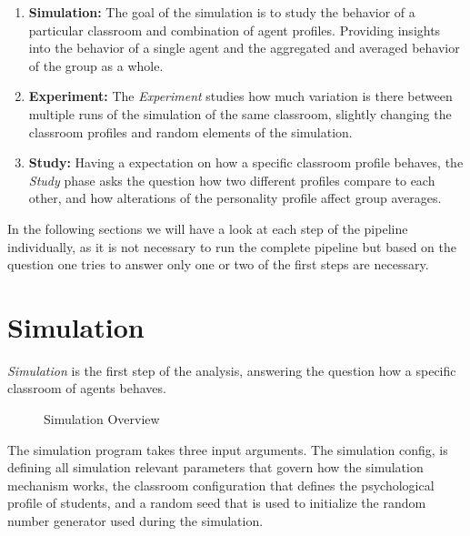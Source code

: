 \begin{enumerate}
    \item \textbf{Simulation:} The goal of the simulation is to study the behavior
    of a particular classroom and combination of agent profiles. Providing insights
    into the behavior of a single agent and the aggregated and averaged behavior of
    the group as a whole.
    \item \textbf{Experiment:} The \textit{Experiment} studies how much variation
    is there between multiple runs of the simulation of the same classroom,
    slightly changing the classroom profiles and random elements of the simulation.
    \item \textbf{Study:} Having a expectation on how a specific classroom profile
    behaves, the \textit{Study} phase asks the question how two different profiles
    compare to each other, and how alterations of the personality profile affect
    group averages.
\end{enumerate}

In the following sections we will have a look at each step of the pipeline individually,
as it is not necessary to run the complete pipeline but based on the question
one tries to answer only one or two of the first steps are necessary.


\section{Simulation}
\textit{Simulation} is the first step of the analysis, answering the question how
a specific classroom of agents behaves.

\begin{figure}[H]
   \hspace*{-4.0\leftmargin}
    \caption{Simulation Overview}
    \label{SimulationOverview}
\end{figure}

The simulation program takes three input arguments. The simulation config,
is defining all simulation relevant parameters that govern how the simulation mechanism
works, the classroom configuration that defines the psychological profile of students,
and a random seed that is used to initialize the random number generator used during
the simulation.


